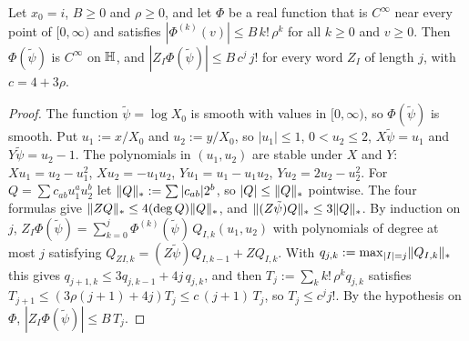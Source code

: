 \begin{lemma}\label{lem:wordphi}
Let $x_0=i$, $B\ge0$ and $\rho\ge0$, and let $\Phi$ be a real function that is $C^\infty$ near every point of $[0,\infty)$ and
satisfies $|\Phi^{(k)}(v)|\le B\,k!\,\rho^k$ for all $k\ge0$ and $v\ge0$. Then $\Phi(\tilde\psi)$ is $C^\infty$ on $\mathbb{H}$, and
$|Z_I\Phi(\tilde\psi)|\le B\,c^j\,j!$ for every word $Z_I$ of length $j$, with $c=4+3\rho$.
\end{lemma}
\begin{proof}
The function $\tilde\psi=\log X_0$ is smooth with values in $[0,\infty)$, so $\Phi(\tilde\psi)$ is smooth. Put $u_1:=x/X_0$ and $u_2:=y/X_0$, so
$|u_1|\le1$, $0<u_2\le2$, $X\tilde\psi=u_1$ and $Y\tilde\psi=u_2-1$. The polynomials in $(u_1,u_2)$ are stable under $X$ and $Y$:
$Xu_1=u_2-u_1^2$, $Xu_2=-u_1u_2$, $Yu_1=u_1-u_1u_2$, $Yu_2=2u_2-u_2^2$. For
$Q=\sum c_{ab}u_1^au_2^b$ let $\lVert Q\rVert_*:=\sum|c_{ab}|2^b$, so $|Q|\le\lVert Q\rVert_*$ pointwise. The four formulas give
$\lVert ZQ\rVert_*\le4(\deg Q)\lVert Q\rVert_*$, and $\lVert (Z\tilde\psi)Q\rVert_*\le3\lVert Q\rVert_*$. By induction on $j$,
$Z_I\Phi(\tilde\psi)=\sum_{k=0}^j\Phi^{(k)}(\tilde\psi)\,Q_{I,k}(u_1,u_2)$ with polynomials of degree at most $j$ satisfying
$Q_{ZI,k}=(Z\tilde\psi)Q_{I,k-1}+ZQ_{I,k}$. With $q_{j,k}:=\max_{|I|=j}\lVert Q_{I,k}\rVert_*$ this gives
$q_{j+1,k}\le3q_{j,k-1}+4j\,q_{j,k}$, and then $T_j:=\sum_kk!\,\rho^kq_{j,k}$ satisfies
$T_{j+1}\le(3\rho(j+1)+4j)T_j\le c\,(j+1)\,T_j$, so $T_j\le c^jj!$. By the hypothesis on $\Phi$,
$|Z_I\Phi(\tilde\psi)|\le B\,T_j$.
\end{proof}

